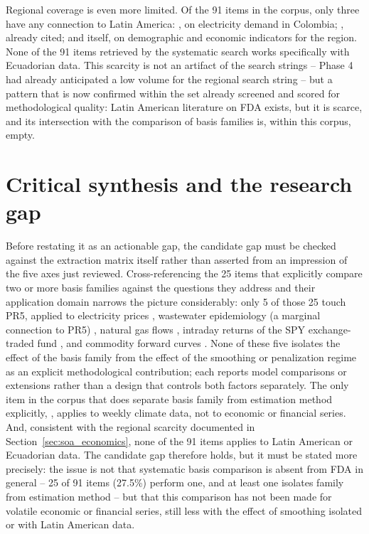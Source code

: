 Regional coverage is even more limited. Of the 91 items in the corpus,
only three have any connection to Latin America: \cite{marin_analyzing_2023},
on electricity demand in Colombia; \cite{rodriguezcuadro_study_2025},
already cited; and \cite{padilla2020} itself, on demographic and
economic indicators for the region. None of the 91 items retrieved by
the systematic search works specifically with Ecuadorian data. This
scarcity is not an artifact of the search strings -- Phase 4 had already
anticipated a low volume for the regional search string -- but a pattern
that is now confirmed within the set already screened and scored for
methodological quality: Latin American literature on FDA exists, but it
is scarce, and its intersection with the comparison of basis families
is, within this corpus, empty.

\section{Critical synthesis and the research gap}
\label{sec:soa_gap}

Before restating it as an actionable gap, the candidate gap must be
checked against the extraction matrix itself rather than asserted from
an impression of the five axes just reviewed. Cross-referencing the 25
items that explicitly compare two or more basis families against the
questions they address and their application domain narrows the picture
considerably: only 5 of those 25 touch PR5, applied to electricity
prices \cite{lisi_joint_2024}, wastewater epidemiology (a marginal
connection to PR5) \cite{salvatore_exploring_2016}, natural gas flows
\cite{chen_review_2021}, intraday returns of the SPY exchange-traded
fund \cite{aue_generalized_2017}, and commodity forward curves
\cite{horvath_time_2020}. None of these five isolates the effect of the
basis family from the effect of the smoothing or penalization regime as
an explicit methodological contribution; each reports model comparisons
or extensions rather than a design that controls both factors
separately. The only item in the corpus that does separate basis family
from estimation method explicitly, \cite{beyaztas_comparison_2022},
applies to weekly climate data, not to economic or financial series.
And, consistent with the regional scarcity documented in
Section~\ref{sec:soa_economics}, none of the 91 items applies to Latin
American or Ecuadorian data. The candidate gap therefore holds, but it
must be stated more precisely: the issue is not that systematic basis
comparison is absent from FDA in general -- 25 of 91 items (27.5\%)
perform one, and at least one isolates family from estimation method --
but that this comparison has not been made for volatile economic or
financial series, still less with the effect of smoothing isolated or
with Latin American data.

